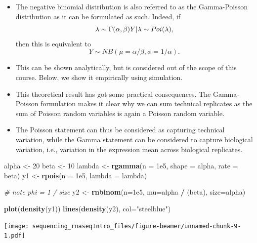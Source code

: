 \documentclass[ignorenonframetext,]{beamer}
\newenvironment{Shaded}{\begin{snugshade}}{\end{snugshade}}
\newcommand{\CommentTok}[1]{\textcolor[rgb]{0.56,0.35,0.01}{\textit{#1}}}
\newcommand{\DataTypeTok}[1]{\textcolor[rgb]{0.13,0.29,0.53}{#1}}
\newcommand{\DecValTok}[1]{\textcolor[rgb]{0.00,0.00,0.81}{#1}}
\newcommand{\FloatTok}[1]{\textcolor[rgb]{0.00,0.00,0.81}{#1}}
\newcommand{\KeywordTok}[1]{\textcolor[rgb]{0.13,0.29,0.53}{\textbf{#1}}}
\newcommand{\NormalTok}[1]{#1}
\newcommand{\OperatorTok}[1]{\textcolor[rgb]{0.81,0.36,0.00}{\textbf{#1}}}
\newcommand{\StringTok}[1]{\textcolor[rgb]{0.31,0.60,0.02}{#1}}
\providecommand{\tightlist}{%
  \setlength{\itemsep}{0pt}\setlength{\parskip}{0pt}}
\begin{document}
\begin{frame}[fragile]

\begin{itemize}
\tightlist
\item
  The negative binomial distribution is also referred to as the
  Gamma-Poisson distribution as it can be formulated as such. Indeed, if
  \[
   \lambda \sim \Gamma(\alpha, \beta) \\
   Y | \lambda \sim Poi(\lambda),
   \] then this is equivalent to
  \[ Y \sim NB(\mu = \alpha / \beta, \phi = 1/\alpha). \]
\item
  This can be shown analytically, but is considered out of the scope of
  this course. Below, we show it empirically using simulation.
\item
  This theoretical result has got some practical consequences. The
  Gamma-Poisson formulation makes it clear why we can sum technical
  replicates as the sum of Poisson random variables is again a Poisson
  random variable.
\item
  The Poisson statement can thus be considered as capturing technical
  variation, while the Gamma statement can be considered to capture
  biological variation, i.e., variation in the expression mean across
  biological replicates.
\end{itemize}

\begin{Shaded}
\begin{Highlighting}[]
\NormalTok{alpha <-}\StringTok{ }\DecValTok{20}
\NormalTok{beta <-}\StringTok{ }\DecValTok{10}
\NormalTok{lambda <-}\StringTok{ }\KeywordTok{rgamma}\NormalTok{(}\DataTypeTok{n =} \FloatTok{1e5}\NormalTok{, }\DataTypeTok{shape =}\NormalTok{ alpha, }\DataTypeTok{rate =}\NormalTok{ beta)}
\NormalTok{y1 <-}\StringTok{ }\KeywordTok{rpois}\NormalTok{(}\DataTypeTok{n =} \FloatTok{1e5}\NormalTok{, }\DataTypeTok{lambda =}\NormalTok{ lambda)}

\CommentTok{# note phi = 1 / size}
\NormalTok{y2 <-}\StringTok{ }\KeywordTok{rnbinom}\NormalTok{(}\DataTypeTok{n=}\FloatTok{1e5}\NormalTok{, }\DataTypeTok{mu=}\NormalTok{alpha }\OperatorTok{/}\StringTok{ }\NormalTok{(beta), }\DataTypeTok{size=}\NormalTok{alpha)}


\KeywordTok{plot}\NormalTok{(}\KeywordTok{density}\NormalTok{(y1))}
\KeywordTok{lines}\NormalTok{(}\KeywordTok{density}\NormalTok{(y2), }\DataTypeTok{col=}\StringTok{"steelblue"}\NormalTok{)}
\end{Highlighting}
\end{Shaded}

\texttt{[image: sequencing\_rnaseqIntro\_files/figure-beamer/unnamed-chunk-9-1.pdf]}

\end{frame}
\end{document}
